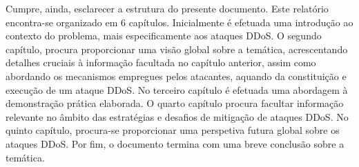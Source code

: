 Cumpre, ainda, esclarecer a estrutura do presente documento. Este relatório encontra-se organizado em 6 capítulos. Inicialmente é efetuada uma introdução ao contexto do problema, mais especificamente aos ataques DDoS. O segundo capítulo, procura proporcionar uma visão global sobre a temática, acrescentando detalhes cruciais à informação facultada no capítulo anterior, assim como abordando os mecanismos empregues pelos atacantes, aquando da constituição e execução de um ataque DDoS. No terceiro capítulo é efetuada uma abordagem à demonstração prática elaborada. O quarto capítulo procura facultar informação relevante no âmbito das estratégias e desafios de mitigação de ataques DDoS. No quinto capítulo, procura-se proporcionar uma perspetiva futura global sobre os ataques DDoS. Por fim, o documento termina com uma breve conclusão sobre a temática.